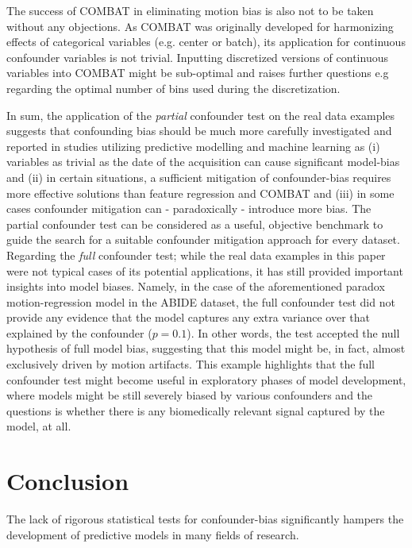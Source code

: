 \documentclass{article}
\begin{document}
 The success of COMBAT in eliminating motion bias is also not to be taken without any objections. As COMBAT was originally developed for harmonizing effects of categorical variables (e.g. center or batch), its application for continuous confounder variables is not trivial. Inputting discretized versions of continuous variables into COMBAT might be sub-optimal and raises further questions e.g regarding the optimal number of bins used during the discretization.
 
 In sum, the application of the \emph{partial} confounder test on the real data examples suggests that confounding bias should be much more carefully investigated and reported in studies utilizing predictive modelling and machine learning as (i) variables as trivial as the date of the acquisition can cause significant model-bias and (ii) in certain situations, a sufficient mitigation of confounder-bias requires more effective solutions than feature regression and COMBAT and (iii) in some cases confounder mitigation can - paradoxically - introduce more bias. The partial confounder test can be considered as a useful, objective benchmark to guide the search for a suitable confounder mitigation approach for every dataset.
 Regarding the \emph{full} confounder test; while the real data examples in this paper were not typical cases of its potential applications, it has still provided important insights into model biases. Namely, in the case of the aforementioned paradox motion-regression model in the ABIDE dataset, the full confounder test did not provide any evidence that the model captures any extra variance over that explained by the confounder ($p=0.1$). In other words, the test accepted the null hypothesis of full model bias, suggesting that this model might be, in fact, almost exclusively driven by motion artifacts.
This example highlights that the full confounder test might become useful in exploratory phases of model development, where models might be still severely biased by various confounders and the questions is whether there is any biomedically relevant signal captured by the model, at all.


\section{Conclusion}

The lack of rigorous statistical tests for confounder-bias significantly hampers the development of predictive models in many fields of research.
\end{document}
